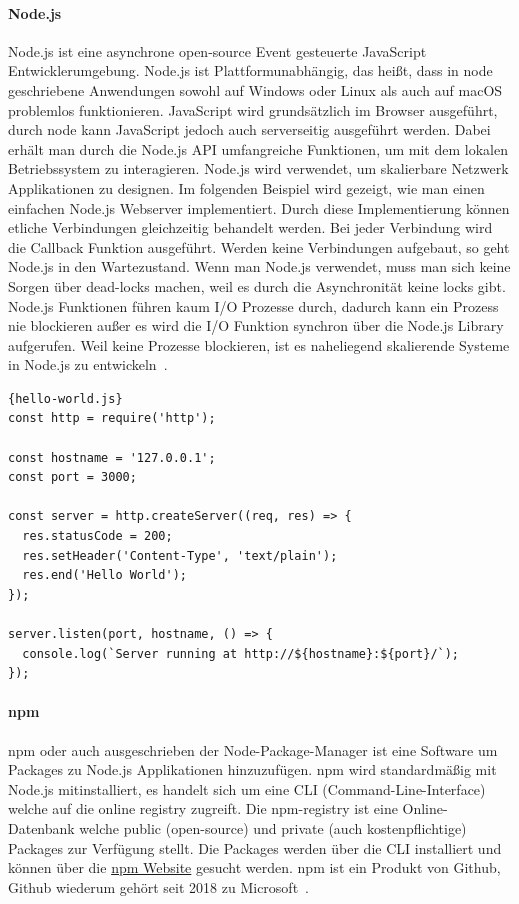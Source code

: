 \paragraph{Node.js}
Node.js ist eine asynchrone open-source Event gesteuerte JavaScript Entwicklerumgebung.
Node.js ist Plattformunabhängig, das heißt, dass in node geschriebene Anwendungen sowohl auf Windows oder Linux als auch auf macOS problemlos funktionieren.
JavaScript wird grundsätzlich im Browser ausgeführt, durch node kann JavaScript jedoch auch serverseitig ausgeführt werden.
Dabei erhält man durch die Node.js API umfangreiche Funktionen, um mit dem lokalen Betriebssystem zu interagieren.
Node.js wird verwendet, um skalierbare Netzwerk Applikationen zu designen.
Im folgenden Beispiel wird gezeigt, wie man einen einfachen Node.js Webserver implementiert.
Durch diese Implementierung können etliche Verbindungen gleichzeitig behandelt werden.
Bei jeder Verbindung wird die Callback Funktion ausgeführt.
Werden keine Verbindungen aufgebaut, so geht Node.js in den Wartezustand.
Wenn man Node.js verwendet, muss man sich keine Sorgen über dead-locks machen, weil es durch die Asynchronität keine locks gibt.
Node.js Funktionen führen kaum I/O Prozesse durch,
dadurch kann ein Prozess nie blockieren außer es wird die I/O Funktion synchron über die Node.js Library aufgerufen.
Weil keine Prozesse blockieren, ist es naheliegend skalierende Systeme in Node.js zu entwickeln~\cite{about-node-js}.

\begin{lstlisting}[label={lst:hello-world.js}]{hello-world.js}
const http = require('http');

const hostname = '127.0.0.1';
const port = 3000;

const server = http.createServer((req, res) => {
  res.statusCode = 200;
  res.setHeader('Content-Type', 'text/plain');
  res.end('Hello World');
});

server.listen(port, hostname, () => {
  console.log(`Server running at http://${hostname}:${port}/`);
});
\end{lstlisting}

\paragraph{npm}
npm oder auch ausgeschrieben der Node-Package-Manager ist eine Software um Packages zu Node.js Applikationen hinzuzufügen.
npm wird standardmäßig mit Node.js mitinstalliert, es handelt sich um eine CLI (Command-Line-Interface) welche auf die online registry zugreift.
Die npm-registry ist eine Online-Datenbank welche public (open-source) und private (auch kostenpflichtige) Packages zur Verfügung stellt.
Die Packages werden über die CLI installiert und können über die \href{https://npmjs.com}{npm Website} gesucht werden.
npm ist ein Produkt von Github, Github wiederum gehört seit 2018 zu Microsoft~\cite{microsoft-acquires-github}.

